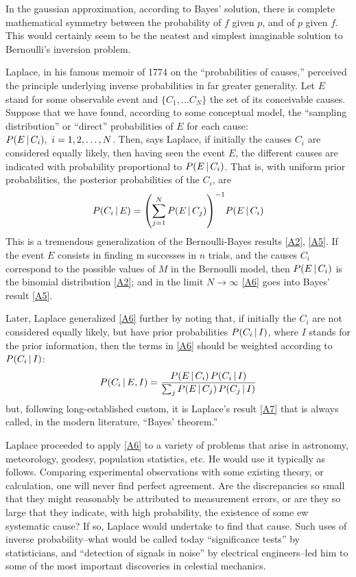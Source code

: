 In the gaussian approximation, according to Bayes’ solution, there is complete mathematical symmetry between the probability of $f$ given $p$, and of $p$ given $f$.
This would certainly seem to be the neatest and simplest imaginable solution to Bernoulli's inversion problem.

Laplace, in his famous memoir of 1774 on the ``probabilities of causes,'' perceived the principle underlying inverse probabilities in far greater generality. Let $E$ stand for some observable event and $\{C_1, \ldots C_N\}$ the set of its conceivable causes.
Suppose that we have found, according to some conceptual model, the ``sampling distribution'' or ``direct'' probabilities of $E$ for each cause: $P(E\given C_i),\ i=1,2,\ldots,N$.
Then, says Laplace, if initially the causes $C_i$ are considered equally likely, then having seen the event $E$, the different causes are indicated with probability proportional to $P(E \,\vert\, C_i)$.
That is, with uniform prior probabilities, the posterior probabilities of the $C_i$, are
\begin{equation}
	\label{A6}
	P(C_i\given E) = \left(\sum_{j=1}^{N} P(E\given C_j)\right)^{-1} P(E\given C_i)
\end{equation}
This is a tremendous generalization of the Bernoulli-Bayes results \eqref{A2}, \eqref{A5}.
If the event $E$ consists in finding m successes in $n$ trials, and the causes $C_i$ correspond to the possible values of $M$ in the Bernoulli model, then $P(E\,\vert\, C_i)$ is the binomial distribution \eqref{A2}; and in the limit $N\to\infty$ \eqref{A6} goes into Bayes' result \eqref{A5}.

Later, Laplace generalized \eqref{A6} further by noting that, if initially the $C_i$ are not considered equally likely, but have prior probabilities $P(C_i\,\vert\, I)$, where $I$ stands for the prior information, then the terms in \eqref{A6} should be weighted according to $P(C_i\,\vert\, I)$:
\begin{equation}
	\label{A7}
	P(C_i\,\vert\, E, I) = \frac{P(E\,\vert\, C_i)\, P(C_i\,\vert\, I)}{\sum_{j} P(E\,\vert\, C_j)\, P(C_j\,\vert\, I)}
\end{equation}
but, following long-established custom, it is Laplace's result \eqref{A7} that is always called, in the modern literature, ``Bayes' theorem.''

Laplace proceeded to apply \eqref{A6} to a variety of problems that arise in astronomy, meteorology, geodesy, population statistics, etc.
He would use it typically as follows.
Comparing experimental observations with some existing theory, or calculation, one will never find perfect agreement.
Are the discrepancies so small that they might reasonably be attributed to measurement errors, or are they so large that they indicate, with high probability, the existence of some ew systematic cause?
If so, Laplace would undertake to find that cause.
Such uses of inverse probability--what would be called today ``significance tests'' by statisticians, and ``detection of signals in noise'' by electrical engineers--led him to some of the most important discoveries in celestial mechanics.

